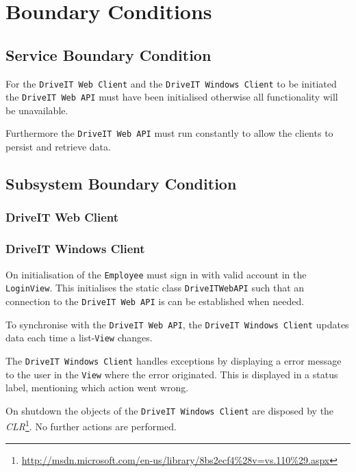\section{Boundary Conditions}
\subsection{Service Boundary Condition}
For the \texttt{DriveIT Web Client} and the \texttt{DriveIT Windows Client} to be initiated the \texttt{DriveIT Web API} must have been initialised otherwise all functionality will be unavailable. 

Furthermore the \texttt{DriveIT Web API} must run constantly to allow the clients to persist and retrieve data.

\subsection{Subsystem Boundary Condition}
\subsubsection{DriveIT Web Client}

\subsubsection{DriveIT Windows Client}
On initialisation of the \texttt{Employee} must sign in with valid account in the \texttt{LoginView}. This initialises the static class \texttt{DriveITWebAPI} such that an connection to the \texttt{DriveIT Web API} is can be established when needed.

To synchronise with the \texttt{DriveIT Web API}, the \texttt{DriveIT Windows Client} updates data each time a list-\texttt{View} changes.

The \texttt{DriveIT Windows Client} handles exceptions by displaying a error message to the user in the \texttt{View} where the error originated. This is displayed in a status label, mentioning which action went wrong.

On shutdown the objects of the \texttt{DriveIT Windows Client} are disposed by the \textit{CLR}\footnote{\url{http://msdn.microsoft.com/en-us/library/8bs2ecf4\%28v=vs.110\%29.aspx}}. No further actions are performed.